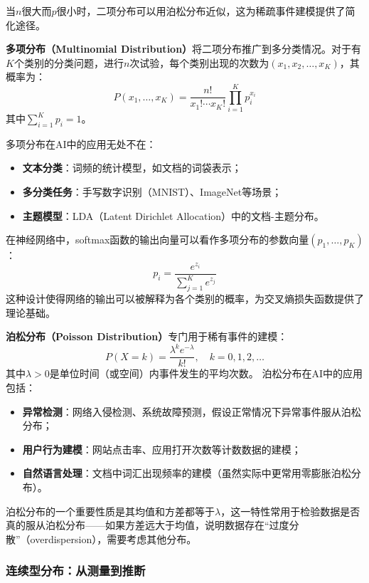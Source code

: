 当$n$很大而$p$很小时，二项分布可以用泊松分布近似，这为稀疏事件建模提供了简化途径。

\textbf{多项分布（Multinomial Distribution）}将二项分布推广到多分类情况。对于有$K$个类别的分类问题，进行$n$次试验，每个类别出现的次数为$(x_1, x_2, \ldots, x_K)$，其概率为：
\begin{equation}
P(x_1, \ldots, x_K) = \frac{n!}{x_1!\cdots x_K!}\prod_{i=1}^K p_i^{x_i}
\end{equation}
其中$\sum_{i=1}^K p_i = 1$。

多项分布在AI中的应用无处不在：
\begin{itemize}
  \item \textbf{文本分类}：词频的统计模型，如文档的词袋表示；
  \item \textbf{多分类任务}：手写数字识别（MNIST）、ImageNet等场景；
  \item \textbf{主题模型}：LDA（Latent Dirichlet Allocation）中的文档-主题分布。
\end{itemize}

在神经网络中，softmax函数的输出向量可以看作多项分布的参数向量$(p_1, \ldots, p_K)$：
\begin{equation}
p_i = \frac{e^{z_i}}{\sum_{j=1}^K e^{z_j}}
\end{equation}
这种设计使得网络的输出可以被解释为各个类别的概率，为交叉熵损失函数提供了理论基础。

\textbf{泊松分布（Poisson Distribution）}专门用于稀有事件的建模：
\begin{equation}
P(X=k) = \frac{\lambda^k e^{-\lambda}}{k!}, \quad k = 0, 1, 2, \ldots
\end{equation}
其中$\lambda > 0$是单位时间（或空间）内事件发生的平均次数。
泊松分布在AI中的应用包括：
\begin{itemize}
  \item \textbf{异常检测}：网络入侵检测、系统故障预测，假设正常情况下异常事件服从泊松分布；
  \item \textbf{用户行为建模}：网站点击率、应用打开次数等计数数据的建模；
  \item \textbf{自然语言处理}：文档中词汇出现频率的建模（虽然实际中更常用零膨胀泊松分布）。
\end{itemize}

泊松分布的一个重要性质是其均值和方差都等于$\lambda$，这一特性常用于检验数据是否真的服从泊松分布——如果方差远大于均值，说明数据存在``过度分散''（overdispersion），需要考虑其他分布。

\subsubsection{连续型分布：从测量到推断}

